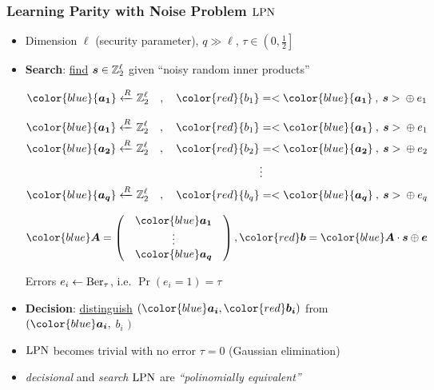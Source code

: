 \begin{frame}
\frametitle{Learning Parity with Noise Problem $\mathrm{LPN}$}
\begin{itemize}[<+->]
 \item Dimension $\ell$ (security parameter), $q \gg \ell$, $\tau \in \left( 0,\frac{1}{2} \right]$
 \item \textbf{Search}: \underline{find}  $ \boldsymbol{s} \in \mathbb{Z}_2^{\ell}$ given ``noisy random inner products'' \\
 \begin{overprint}
 \begin{align*}
  {\color{blue}{\vect{a_1}}} \R \zol \quad , \quad {\color{red}{b_1}} &= <{\color{blue}{\vect{a_1}}} \: , \: \vect{s}> \: \xor \: e_1 \\  
  \end{align*}

  \begin{align*}
  {\color{blue}{\vect{a_1}}} \R \zol \quad , \quad {\color{red}{b_1}} &= <{\color{blue}{\vect{a_1}}} \: , \: \vect{s}> \: \xor \: e_1 \\
  {\color{blue}{\vect{a_2}}} \R \zol \quad, \quad  {\color{red}{b_2}} &= <{\color{blue}{\vect{a_2}}} \: , \: \vect{s}> \: \xor \: e_2 \\
   & \vdots \\
   {\color{blue}{\vect{a_q}}} \R \zol \quad, \quad  {\color{red}{b_q}} &= <{\color{blue}{\vect{a_q}}} \: , \: \vect{s}> \: \xor \: e_q \\
  \end{align*}

  \vspace*{25pt}
\[
{\color{blue} \vect{A}} = \begin{pmatrix}
            & {\color{blue}\vect{a_1}} & \\
            & \vdots  & \\ 
            & {\color{blue}\vect{a_q}} & 
           \end{pmatrix}  , {\color{red} \vect{b}} = {\color{blue} \vect{A}} \cdot \vect{s} \xor \vect{e} 
\]
 \end{overprint}
  Errors $e_i \gets \mathrm{Ber}_{\tau}$, i.e. $\Pr(e_i=1)= \tau$
 \item \textbf{Decision}: \underline{distinguish} $\left( {\color{blue}\vect{a_i}}, {\color{red}\vect{b_i}} \right)$ from {\color{blue}{uniform}} $( {\color{blue}\vect{a_i}}, $ {\color{blue} $b_i$} $)$
 \item $\mathrm{LPN}$ becomes trivial with no error $\tau=0$ (Gaussian elimination)
 \item \emph{decisional} and \emph{search} $\mathrm{LPN}$ are \emph{``polinomially equivalent''} \\ 
 \end{itemize}
\end{frame}

